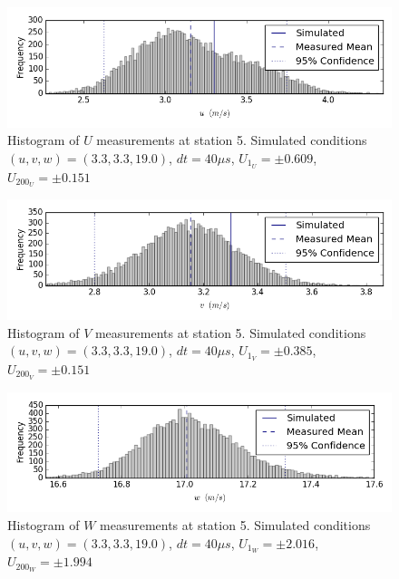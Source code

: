 \begin{figure}[H]
\centering
\includegraphics[width=6in]{figs/Ely_May28th05002/uncertainty_Ely_May28th05002_U}
\caption{Histogram of $U$ measurements at station 5. Simulated conditions $(u,v,w)=(3.3, 3.3, 19.0)$, $dt=40 \mu s$, $U_1_U=\pm 0.609$, $U_200_U=\pm 0.151$}
\label{fig:uncertainty_Ely_May28th05002_U}
\end{figure}


\begin{figure}[H]
\centering
\includegraphics[width=6in]{figs/Ely_May28th05002/uncertainty_Ely_May28th05002_V}
\caption{Histogram of $V$ measurements at station 5. Simulated conditions $(u,v,w)=(3.3, 3.3, 19.0)$, $dt=40 \mu s$, $U_1_V=\pm 0.385$, $U_200_V=\pm 0.151$}
\label{fig:uncertainty_Ely_May28th05002_V}
\end{figure}


\begin{figure}[H]
\centering
\includegraphics[width=6in]{figs/Ely_May28th05002/uncertainty_Ely_May28th05002_W}
\caption{Histogram of $W$ measurements at station 5. Simulated conditions $(u,v,w)=(3.3, 3.3, 19.0)$, $dt=40 \mu s$, $U_1_W=\pm 2.016$, $U_200_W=\pm 1.994$}
\label{fig:uncertainty_Ely_May28th05002_W}
\end{figure}


